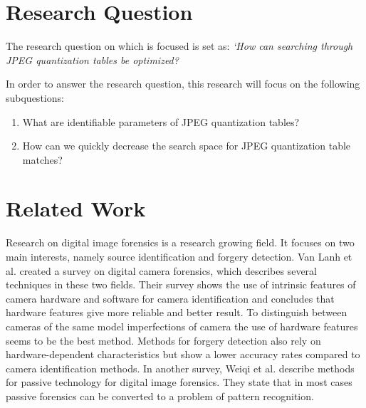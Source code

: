 \documentclass[a4paper,8pt]{article}
\begin{document}





\section*{Research Question}

The research question on which is focused is set as: \textit{`How can searching through JPEG quantization tables be optimized?}

In order to answer the research question, this research will focus on the following subquestions:
\begin{enumerate}
\item What are identifiable parameters of JPEG quantization tables?
\item How can we quickly decrease the search space for JPEG quantization table matches?
\end{enumerate}

\section*{Related Work}
Research on digital image forensics is a research growing field. It focuses on two main interests, namely source identification and forgery detection. Van Lanh et al. \cite{van2007survey} created a survey on digital camera forensics, which describes several techniques in these two fields. Their survey shows the use of intrinsic features of camera hardware and software for camera identification and concludes that hardware features give more reliable and better result. To distinguish between cameras of the same model imperfections of camera the use of hardware features seems to be the best method. Methods for forgery detection also rely on hardware-dependent characteristics but show a lower accuracy rates compared to camera identification methods. In another survey, Weiqi et al. \cite{luo2007survey} describe methods for passive technology for digital image forensics. They state that in most cases passive forensics can be converted to a problem of pattern recognition.
\end{document}
